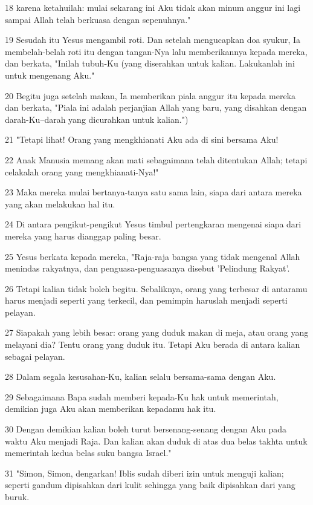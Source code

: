 \par 18 karena ketahuilah: mulai sekarang ini Aku tidak akan minum anggur ini lagi sampai Allah telah berkuasa dengan sepenuhnya."
\par 19 Sesudah itu Yesus mengambil roti. Dan setelah mengucapkan doa syukur, Ia membelah-belah roti itu dengan tangan-Nya lalu memberikannya kepada mereka, dan berkata, "Inilah tubuh-Ku (yang diserahkan untuk kalian. Lakukanlah ini untuk mengenang Aku."
\par 20 Begitu juga setelah makan, Ia memberikan piala anggur itu kepada mereka dan berkata, "Piala ini adalah perjanjian Allah yang baru, yang disahkan dengan darah-Ku--darah yang dicurahkan untuk kalian.")
\par 21 "Tetapi lihat! Orang yang mengkhianati Aku ada di sini bersama Aku!
\par 22 Anak Manusia memang akan mati sebagaimana telah ditentukan Allah; tetapi celakalah orang yang mengkhianati-Nya!"
\par 23 Maka mereka mulai bertanya-tanya satu sama lain, siapa dari antara mereka yang akan melakukan hal itu.
\par 24 Di antara pengikut-pengikut Yesus timbul pertengkaran mengenai siapa dari mereka yang harus dianggap paling besar.
\par 25 Yesus berkata kepada mereka, "Raja-raja bangsa yang tidak mengenal Allah menindas rakyatnya, dan penguasa-penguasanya disebut 'Pelindung Rakyat'.
\par 26 Tetapi kalian tidak boleh begitu. Sebaliknya, orang yang terbesar di antaramu harus menjadi seperti yang terkecil, dan pemimpin haruslah menjadi seperti pelayan.
\par 27 Siapakah yang lebih besar: orang yang duduk makan di meja, atau orang yang melayani dia? Tentu orang yang duduk itu. Tetapi Aku berada di antara kalian sebagai pelayan.
\par 28 Dalam segala kesusahan-Ku, kalian selalu bersama-sama dengan Aku.
\par 29 Sebagaimana Bapa sudah memberi kepada-Ku hak untuk memerintah, demikian juga Aku akan memberikan kepadamu hak itu.
\par 30 Dengan demikian kalian boleh turut bersenang-senang dengan Aku pada waktu Aku menjadi Raja. Dan kalian akan duduk di atas dua belas takhta untuk memerintah kedua belas suku bangsa Israel."
\par 31 "Simon, Simon, dengarkan! Iblis sudah diberi izin untuk menguji kalian; seperti gandum dipisahkan dari kulit sehingga yang baik dipisahkan dari yang buruk.

